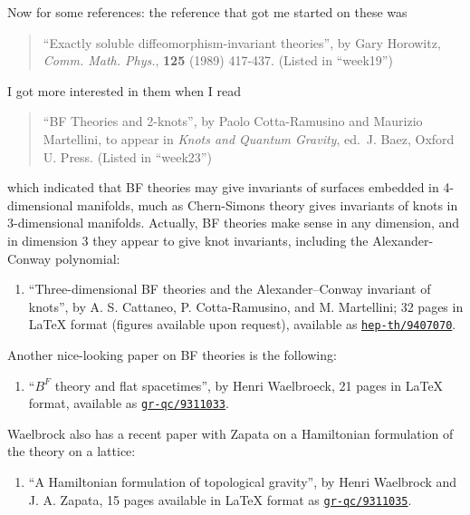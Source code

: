 \documentclass{article}
\def\tightlist{}
\begin{document}
Now for some references: the reference that got me started on these was

\begin{quote}
``Exactly soluble diffeomorphism-invariant theories'', by Gary Horowitz,
\emph{Comm. Math. Phys.}, \textbf{125} (1989) 417-437. (Listed in
``week19'')
\end{quote}

I got more interested in them when I read

\begin{quote}
``BF Theories and 2-knots'', by Paolo Cotta-Ramusino and Maurizio
Martellini, to appear in \emph{Knots and Quantum Gravity}, ed.~J. Baez,
Oxford U. Press. (Listed in ``week23'')
\end{quote}

which indicated that BF theories may give invariants of surfaces
embedded in 4-dimensional manifolds, much as Chern-Simons theory gives
invariants of knots in 3-dimensional manifolds. Actually, BF theories
make sense in any dimension, and in dimension 3 they appear to give knot
invariants, including the Alexander-Conway polynomial:

\begin{enumerate}
\def\labelenumi{\arabic{enumi})}
\tightlist
\item
  ``Three-dimensional BF theories and the Alexander--Conway invariant of
  knots'', by A. S. Cattaneo, P. Cotta-Ramusino, and M. Martellini; 32
  pages in LaTeX format (figures available upon request), available as
  \href{http://xxx.lanl.gov/ps/hep-th/9407070}{\texttt{hep-th/9407070}}.
\end{enumerate}

Another nice-looking paper on BF theories is the following:

\begin{enumerate}
\def\labelenumi{\arabic{enumi})}
\setcounter{enumi}{1}
\tightlist
\item
  ``\(B^F\) theory and flat spacetimes'', by Henri Waelbroeck, 21 pages
  in LaTeX format, available as
  \href{http://xxx.lanl.gov/ps/gr-qc/9311033}{\texttt{gr-qc/9311033}}.
\end{enumerate}

Waelbrock also has a recent paper with Zapata on a Hamiltonian
formulation of the theory on a lattice:

\begin{enumerate}
\def\labelenumi{\arabic{enumi})}
\setcounter{enumi}{2}
\tightlist
\item
  ``A Hamiltonian formulation of topological gravity'', by Henri
  Waelbrock and J. A. Zapata, 15 pages available in LaTeX format as
  \href{http://xxx.lanl.gov/ps/gr-qc/9311035}{\texttt{gr-qc/9311035}}.
\end{enumerate}
\end{document}
